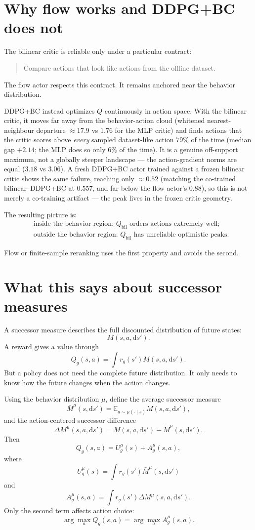 \documentclass[12pt]{article}
\begin{document}
\section*{Why flow works and DDPG+BC does not}
The bilinear critic is reliable only under a particular contract:
\begin{quote}
Compare actions that look like actions from the offline dataset.
\end{quote}
The flow actor respects this contract. It remains anchored near the behavior distribution.

DDPG+BC instead optimizes $Q$ continuously in action space. With the bilinear critic, it moves far away from the behavior-action cloud (whitened nearest-neighbour departure $\approx 17.9$ vs $1.76$ for the MLP critic) and finds actions that the critic scores above \emph{every} sampled dataset-like action $79\%$ of the time (median gap $+2.14$; the MLP does so only $6\%$ of the time). It is a genuine off-support maximum, not a globally steeper landscape --- the action-gradient norms are equal ($3.18$ vs $3.06$). A fresh DDPG+BC actor trained against a frozen bilinear critic shows the same failure, reaching only $\approx 0.52$ (matching the co-trained bilinear--DDPG+BC at $0.557$, and far below the flow actor's $0.88$), so this is not merely a co-training artifact --- the peak lives in the frozen critic geometry.

The resulting picture is:
$$ 
\boxed{
\begin{aligned}
&\text{inside the behavior region: } Q_{\mathrm{bil}} \text{ orders actions extremely well};\\
&\text{outside the behavior region: } Q_{\mathrm{bil}} \text{ has unreliable optimistic peaks}.
\end{aligned}
}
$$

Flow or finite-sample reranking uses the first property and avoids the second.

\section*{What this says about successor measures}
A successor measure describes the full discounted distribution of future states:
$$ M(s,a,\mathrm ds'). $$
A reward gives a value through
$$ Q_g(s,a) = \int r_g(s')M(s,a,\mathrm ds'). $$
But a policy does not need the complete future distribution. It only needs to know how the future changes when the action changes.

Using the behavior distribution $\mu$, define the average successor measure
$$ \bar M^\mu(s,\mathrm ds') = \mathbb E_{a\sim\mu(\cdot\mid s)} M(s,a,\mathrm ds'), $$
and the action-centered successor difference
$$ \Delta M^\mu(s,a,\mathrm ds') = M(s,a,\mathrm ds') - \bar M^\mu(s,\mathrm ds'). $$
Then
$$ Q_g(s,a) = U_g^\mu(s) + A_g^\mu(s,a), $$
where
$$ U_g^\mu(s) = \int r_g(s')\bar M^\mu(s,\mathrm ds') $$
and
$$ A_g^\mu(s,a) = \int r_g(s')\Delta M^\mu(s,a,\mathrm ds'). $$
Only the second term affects action choice:
$$ \arg\max_a Q_g(s,a) = \arg\max_a A_g^\mu(s,a). $$
\end{document}
